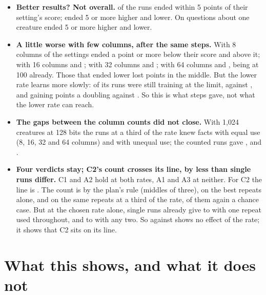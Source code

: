 \documentclass[10pt,letterpaper]{article}
\newcommand{\lead}[1]{\textbf{#1}}               %
\begin{document}
\begin{itemize}
\item \lead{Better results? Not overall.} \RcWithin{} of the \RcRuns{} runs ended within 5 points of their
      setting's score; \RcHigher{} ended 5 or more higher and \RcLower{} lower. On questions about one creature
      \RcQuestionsHigher{} ended 5 or more higher and \RcQuestionsLower{} lower.
\item \lead{A little worse with few columns, after the same \Limit{} steps.} With 8 columns \RcDownEight{}
      of the \RcPerColumns{} settings ended a point or more below their score and \RcUpEight{} above it; with
      16 columns \RcDownSixteen{} and \RcUpSixteen; with 32 columns \RcDownThirtyTwo{} and \RcUpThirtyTwo;
      with 64 columns \RcDownSixtyFourWord{} and \RcUpSixtyFour, \RcTopSixtyFour{} being at 100 already. Those
      that ended lower lost \RcLostMiddle{} points in the middle. But the lower rate learns more slowly:
      \RcLimitThird{} of its runs were still training at the limit, against \RcLimitChosen, and gaining
      \RcLimitGainThird{} points a doubling against \RcLimitGainChosen. So this is what \Limit{} steps gave,
      not what the lower rate can reach.
\item \lead{The gaps between the column counts did not close.} With 1,024 creatures at 128 bits the runs at a
      third of the rate knew \RcTypicalEqual{} facts with equal use (8, 16, 32 and 64 columns) and
      \RcTypicalUnequal{} with unequal use; the counted runs gave \TypicalEqual, and \TypicalUnequal.
\item \lead{Four verdicts stay; C2's count crosses its line, by less than single runs differ.} C1 and A2
      hold at both rates, A1 and A3 at neither. For C2 the line is \CTwoAllowed. The count is
      \CTwoGained{} by the plan's rule (middles of three), \RcCTwoChosen{} on the best repeats alone, and
      \RcCTwoThird{} on the same repeats at a third of the rate, \RcCTwoByChance{} of them again a chance
      case. But at the chosen rate alone, single runs already give \CTwoSameRepeatLow{} to
      \CTwoSameRepeatHigh{} with one repeat used throughout, and \CTwoSingleLow{} to \CTwoSingleHigh{} with
      any two. So \RcCTwoChosen{} against \RcCTwoThird{} shows no effect of the rate; it shows that C2 sits on
      its line.
\end{itemize}

\section{What this shows, and what it does not}\label{s:shows}
\end{document}
